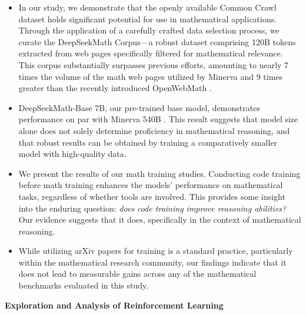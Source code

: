 \begin{itemize}[topsep=0pt]
    \item In our study, we demonstrate that the openly available Common Crawl dataset holds significant potential for use in mathematical applications. Through the application of a carefully crafted data selection process, we curate the DeepSeekMath Corpus—a robust dataset comprising 120B tokens extracted from web pages specifically filtered for mathematical relevance. This corpus substantially surpasses previous efforts, amounting to nearly 7 times the volume of the math web pages utilized by Minerva \citep{minerva} and 9 times greater than the recently introduced OpenWebMath \citep{openwebmath}.

\item DeepSeekMath-Base 7B, our pre-trained base model, demonstrates performance on par with Minerva 540B \citep{minerva}. This result suggests that model size alone does not solely determine proficiency in mathematical reasoning, and that robust results can be obtained by training a comparatively smaller model with high-quality data.

\item We present the results of our math training studies. Conducting code training before math training enhances the models' performance on mathematical tasks, regardless of whether tools are involved. This provides some insight into the enduring question: \textit{does code training improve reasoning abilities?} Our evidence suggests that it does, specifically in the context of mathematical reasoning.

\item While utilizing arXiv papers for training is a standard practice, particularly within the mathematical research community, our findings indicate that it does not lead to measurable gains across any of the mathematical benchmarks evaluated in this study.
\end{itemize}

\textbf{Exploration and Analysis of Reinforcement Learning}

